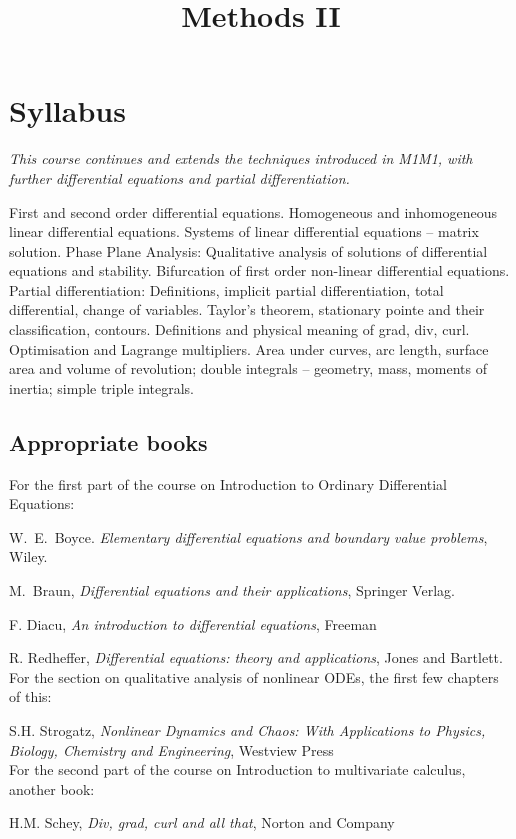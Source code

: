 \documentclass[twoside]{scrartcl}
\title{Methods II}
\begin{document}
{
\section*{Syllabus}

\textit{This course continues and extends the techniques introduced in M1M1, with further differential equations and partial differentiation.}


\vspace*{-5pt} First and second order differential equations. Homogeneous and inhomogeneous linear differential equations. Systems of linear differential equations – matrix solution. Phase Plane Analysis: Qualitative analysis of solutions of differential equations and stability. Bifurcation of first order non-linear differential equations.
\vspace*{-5pt}
 Partial differentiation: Definitions, implicit partial differentiation, total differential, change of variables. Taylor’s theorem, stationary pointe and their classification, contours. Definitions and physical meaning of grad, div, curl.  Optimisation and Lagrange multipliers. Area under curves, arc length, surface area and volume of revolution; double integrals – geometry, mass, moments of inertia; simple triple integrals.\\

\subsection*{Appropriate books}

For the first part of the course on Introduction to Ordinary Differential Equations:

{\shortskip 
W.~E.~Boyce. \emph{Elementary differential equations and boundary value problems}, Wiley.

M.~Braun, \emph{Differential equations and their applications}, Springer Verlag.

F. Diacu, \emph{An introduction to differential equations}, Freeman

R. Redheffer, \emph{Differential equations: theory and applications}, Jones and Bartlett.\\


For the section on qualitative analysis of nonlinear ODEs, the first few chapters of this:


S.H. Strogatz, \emph{Nonlinear Dynamics and Chaos: With Applications to Physics, Biology, Chemistry and Engineering}, Westview Press\\


For the second part of the course on Introduction to multivariate calculus, another book:

H.M. Schey, \emph{Div, grad, curl and all that}, Norton and Company
}}
\end{document}

